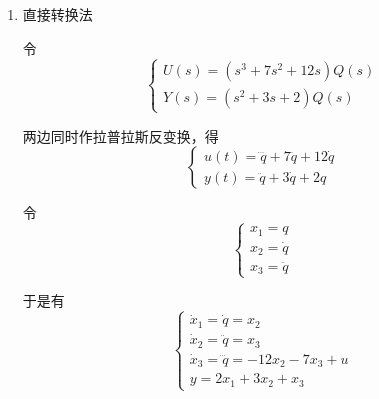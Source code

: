 \begin{enumerate}
    \item 直接转换法
    
    令
    \begin{equation*}
        \begin{cases}
            U(s) = (s^3 + 7s^2 + 12s) Q(s) \\
            Y(s) = (s^2 + 3s +2) Q(s)
        \end{cases}
    \end{equation*}

    两边同时作拉普拉斯反变换，得
    \begin{equation*}
        \begin{cases}
            u(t) = \dddot{q} + 7\ddot{q} + 12\dot{q} \\
            y(t) = \ddot{q} + 3\dot{q} + 2q
        \end{cases}
    \end{equation*}

    令
    \begin{equation*}
        \begin{cases}
            x_1 = q \\
            x_2 = \dot{q} \\
            x_3 = \ddot{q}
        \end{cases}
    \end{equation*}

    于是有
    \begin{equation*}
        \begin{cases}
            \dot{x}_1 = \dot{q} = x_2 \\
            \dot{x}_2 = \ddot{q} = x_3 \\
            \dot{x}_3 = \dddot{q} = -12x_2 - 7x_3 + u \\
            y = 2x_1 + 3x_2 + x_3
        \end{cases}
    \end{equation*}


\end{enumerate}
